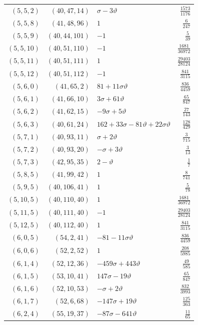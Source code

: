 \begin{longtable}{rrlr}
$(5,5,2)$ & $(40,47,14)$ & $\sigma-3\vartheta$ & $\frac{1573}{1176}$\\
$(5,5,8)$ & $(41,48,96)$ & $1$ & $\frac{6}{247}$\\
$(5,5,9)$ & $(40,44,101)$ & $-1$ & $\frac{5}{39}$\\
$(5,5,10)$ & $(40,51,110)$ & $-1$ & $\frac{1681}{36972}$\\
$(5,5,11)$ & $(40,51,111)$ & $1$ & $\frac{29403}{28124}$\\
$(5,5,12)$ & $(40,51,112)$ & $-1$ & $\frac{841}{3115}$\\
$(5,6,0)$ & $(41,65,2)$ & $81+11\sigma\vartheta$ & $\frac{836}{4459}$\\
$(5,6,1)$ & $(41,66,10)$ & $3\sigma+61\vartheta$ & $\frac{65}{847}$\\
$(5,6,2)$ & $(41,62,15)$ & $-9\sigma+5\vartheta$ & $\frac{27}{143}$\\
$(5,6,3)$ & $(40,61,24)$ & $162+33\sigma-81\vartheta+22\sigma\vartheta$ & $\frac{128}{429}$\\
$(5,7,1)$ & $(40,93,11)$ & $\sigma+2\vartheta$ & $\frac{3}{715}$\\
$(5,7,2)$ & $(40,93,20)$ & $-\sigma+3\vartheta$ & $\frac{3}{13}$\\
$(5,7,3)$ & $(42,95,35)$ & $2-\vartheta$ & $\frac{1}{7}$\\
$(5,8,5)$ & $(41,99,42)$ & $1$ & $\frac{8}{741}$\\
$(5,9,5)$ & $(40,106,41)$ & $1$ & $\frac{5}{78}$\\
$(5,10,5)$ & $(40,110,40)$ & $1$ & $\frac{1681}{36972}$\\
$(5,11,5)$ & $(40,111,40)$ & $-1$ & $\frac{29403}{28124}$\\
$(5,12,5)$ & $(40,112,40)$ & $1$ & $\frac{841}{3115}$\\
$(6,0,5)$ & $(54,2,41)$ & $-81-11\sigma\vartheta$ & $\frac{836}{4459}$\\
$(6,0,6)$ & $(52,2,52)$ & $1$ & $\frac{208}{5985}$\\
$(6,1,4)$ & $(52,12,36)$ & $-459\sigma+443\vartheta$ & $\frac{49}{585}$\\
$(6,1,5)$ & $(53,10,41)$ & $147\sigma-19\vartheta$ & $\frac{65}{847}$\\
$(6,1,6)$ & $(52,10,53)$ & $-\sigma+2\vartheta$ & $\frac{832}{3993}$\\
$(6,1,7)$ & $(52,6,68)$ & $-147\sigma+19\vartheta$ & $\frac{125}{363}$\\
$(6,2,4)$ & $(55,19,37)$ & $-87\sigma-641\vartheta$ & $\frac{11}{65}$\\

\end{longtable}

